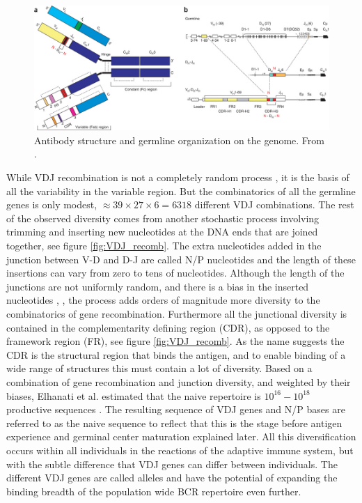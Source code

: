 \begin{figure}
    \centering
    \includegraphics[width=1\textwidth]{figures/ab_structure.jpg}
    \caption{
        \label{fig:BCR_structure2}
        Antibody structure and germline organization on the genome.
        From \cite{georgiou2014promise}.
    }
\end{figure}


While VDJ recombination is not a completely random process \cite{li2012recombinatorial}, it is the basis of all the variability in the variable region.
But the combinatorics of all the germline genes is only modest, $\approx 39\times27\times6=6318$ different VDJ combinations.
The rest of the observed diversity comes from another stochastic process involving trimming and inserting new nucleotides at the DNA ends that are joined together, see figure \ref{fig:VDJ_recomb}.
The extra nucleotides added in the junction between V-D and D-J are called N/P nucleotides and the length of these insertions can vary from zero to tens of nucleotides.
Although the length of the junctions are not uniformly random, and there is a bias in the inserted nucleotides \cite{murugan2012statistical}, \cite{elhanati2015inferring}, the process adds orders of magnitude more diversity to the combinatorics of gene recombination.
Furthermore all the junctional diversity is contained in the complementarity defining region (CDR), as opposed to the framework region (FR), see figure \ref{fig:VDJ_recomb}.
As the name suggests the CDR is the structural region that binds the antigen, and to enable binding of a wide range of structures this must contain a lot of diversity.
Based on a combination of gene recombination and junction diversity, and weighted by their biases, Elhanati et al. estimated that the naive repertoire is $10^{16} - 10^{18}$ productive sequences \cite{elhanati2015inferring}.
The resulting sequence of VDJ genes and N/P bases are referred to as the naive sequence to reflect that this is the stage before antigen experience and germinal center maturation explained later.
All this diversification occurs within all individuals in the reactions of the adaptive immune system, but with the subtle difference that VDJ genes can differ between individuals.
The different VDJ genes are called alleles and have the potential of expanding the binding breadth of the population wide BCR repertoire even further.

